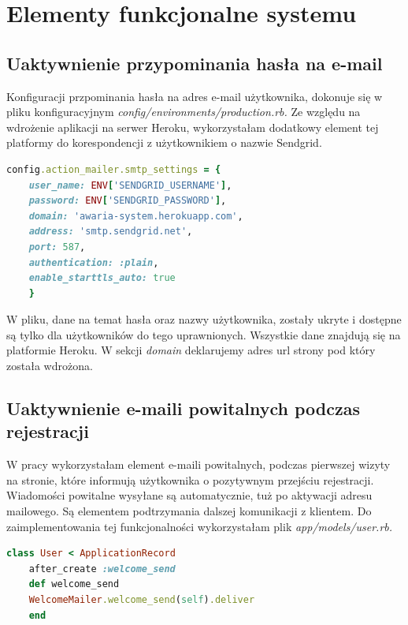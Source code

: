 \documentclass[openright]{xmgr}
\begin{document}
	\chapter{Elementy funkcjonalne systemu}
	
	\section{Uaktywnienie przypominania hasła na e-mail}
	
	Konfiguracji przpominania hasła na adres e-mail użytkownika, dokonuje się w pliku konfiguracyjnym \textit{config/environments/production.rb.} Ze względu na wdrożenie aplikacji na serwer Heroku, wykorzystałam dodatkowy element tej platformy do korespondencji z użytkownikiem o nazwie Sendgrid.  
	
	\begin{lstlisting}[language=Ruby,lineskip={-1pt},caption=Konfiguracja pliku \textit{production.rb}]
	config.action_mailer.smtp_settings = {
	user_name: ENV['SENDGRID_USERNAME'],
	password: ENV['SENDGRID_PASSWORD'],
	domain: 'awaria-system.herokuapp.com',
	address: 'smtp.sendgrid.net',
	port: 587,
	authentication: :plain,
	enable_starttls_auto: true
	}
	\end{lstlisting}
	
	W pliku, dane na temat hasła oraz nazwy użytkownika, zostały ukryte i dostępne są tylko dla użytkowników do tego uprawnionych. Wszystkie dane znajdują się na platformie Heroku. W sekcji \textit{domain} deklarujemy adres url strony pod który została wdrożona.
	\newpage
	\section{Uaktywnienie e-maili powitalnych podczas rejestracji}
	
	W pracy wykorzystałam element e-maili powitalnych, podczas pierwszej wizyty na stronie, które informują użytkownika o pozytywnym przejściu rejestracji. Wiadomości powitalne wysyłane są automatycznie, tuż po aktywacji adresu mailowego. Są elementem podtrzymania dalszej komunikacji z klientem. Do zaimplementowania tej funkcjonalności wykorzystałam plik \textit{app/models/user.rb.} 
	
	\begin{lstlisting}[language=Ruby,lineskip={-1pt},caption=Kod odpowiedzialny za wysyłanie e-mail powitalnych]
	class User < ApplicationRecord
	after_create :welcome_send
	def welcome_send
	WelcomeMailer.welcome_send(self).deliver
	end
	\end{lstlisting}
	
\end{document}
